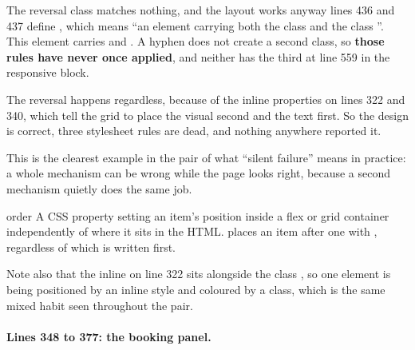 \begin{honest}{The reversal class matches nothing, and the layout works anyway}
 lines 436 and 437 define , which means ``an
element carrying both the class  and the class ''.
This element carries  and . A hyphen does
not create a second class, so \textbf{those rules have never once applied}, and
neither has the third at line 559 in the responsive block.

The reversal happens regardless, because of the inline  properties on
lines 322 and 340, which tell the grid to place the visual second and the text
first. So the design is correct, three stylesheet rules are dead, and nothing
anywhere reported it.

This is the clearest example in the pair of what ``silent failure'' means in
practice: a whole mechanism can be wrong while the page looks right, because a
second mechanism quietly does the same job.
\end{honest}

\begin{jargon}{order}
A CSS property setting an item's position inside a flex or grid container
independently of where it sits in the HTML.  places an item after
one with , regardless of which is written first.
\end{jargon}

Note also that the inline  on line 322 sits alongside the
class , so one element is being positioned by an inline style and
coloured by a class, which is the same mixed habit seen throughout the pair.

\paragraph{Lines 348 to 377: the booking panel.}


